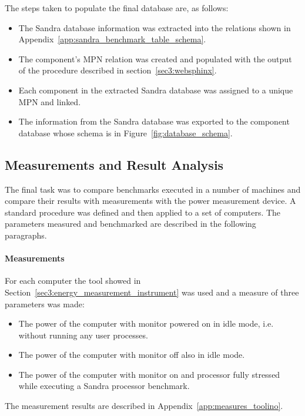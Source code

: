    The steps taken to populate the final database are, as follows:
    \begin{itemize}
        \item The Sandra database information was extracted into the relations shown in Appendix~\ref{app:sandra_benchmark_table_schema}.
        \item The component's MPN relation was created and populated with the output of the procedure described in section~\ref{sec3:websphinx}.
        \item Each component in the extracted Sandra database was assigned to a unique MPN and linked.
        \item The information from the Sandra database was exported to the component database whose schema is in Figure~\ref{fig:database_schema}.
    \end{itemize}
    
\subsection{Measurements and Result Analysis} \label{sec4:measurements}    
    
    The final task was to compare benchmarks executed in a number of machines and compare their results with measurements with the power measurement device. A standard procedure was defined and then applied to a set of computers. The parameters measured and benchmarked are described in the following paragraphs.

    \paragraph*{Measurements}
        For each computer the tool showed in Section~\ref{sec3:energy_measurement_instrument} was used and a measure of three parameters was made:
        \begin{itemize}
            \item The power of the computer with monitor powered on in idle mode, i.e. without running any user processes.
            \item The power of the computer with monitor off also in idle mode.
            \item The power of the computer with monitor on and processor fully stressed while executing a Sandra processor benchmark.
        \end{itemize}
            
        The measurement results are described in Appendix~\ref{app:measures_toolino}.
            
